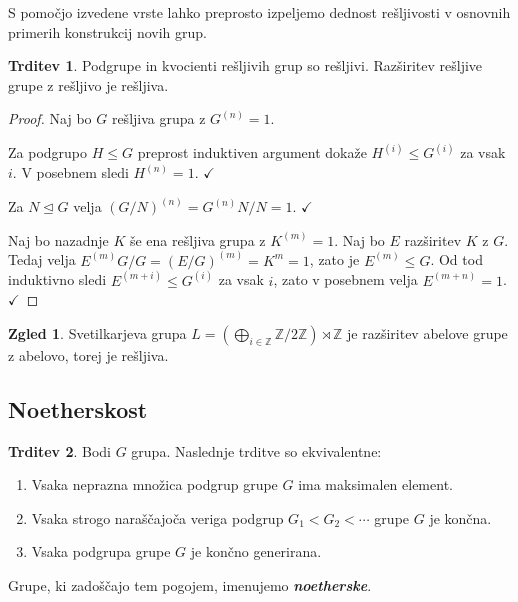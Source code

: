 \documentclass[11pt]{book}
\def\ZZ{\mathbb{Z}}
\def\definicija{\color{rdeca}\bf\em}
\def\kljuka{$\checkmark$}
\theoremstyle{definition}
\theoremstyle{zgled}
\newtheorem*{zgled}{Zgled}
\theoremstyle{odprtproblem}
\theoremstyle{domacanaloga}
\newenvironment{dokaz}
    {\color{siva}\begin{proof}}
    {\end{proof}}
\theoremstyle{izrek}
\newtheorem*{trditev}{Trditev}
\begin{document}
S pomočjo izvedene vrste lahko preprosto izpeljemo dednost rešljivosti v osnovnih primerih konstrukcij novih grup.

\begin{trditev}
Podgrupe in kvocienti rešljivih grup so rešljivi. Razširitev rešljive grupe z rešljivo je rešljiva.
\end{trditev}

\begin{dokaz}
Naj bo $G$ rešljiva grupa z $G^{(n)} = 1$. 

Za podgrupo $H \leq G$ preprost induktiven argument dokaže $H^{(i)} \leq G^{(i)}$ za vsak $i$. V posebnem sledi $H^{(n)} = 1$. \kljuka

Za $N \unlhd G$ velja $(G/N)^{(n)} = G^{(n)}N/N = 1$. \kljuka

Naj bo nazadnje $K$ še ena rešljiva grupa z $K^{(m)} = 1$. Naj bo $E$ razširitev $K$ z $G$. Tedaj velja $E^{(m)}G/G = (E/G)^{(m)} = K^m = 1$, zato je $E^{(m)} \leq G$. Od tod induktivno sledi $E^{(m+i)} \leq G^{(i)}$ za vsak $i$, zato v posebnem velja $E^{(m+n)} = 1$. \kljuka
\end{dokaz}

\begin{zgled}
Svetilkarjeva grupa $L = (\bigoplus_{i \in \ZZ} \ZZ/2\ZZ) \rtimes \ZZ$ je razširitev abelove grupe z abelovo, torej je rešljiva.
\end{zgled}

\subsection{Noetherskost}

\begin{trditev}
Bodi $G$ grupa. Naslednje trditve so ekvivalentne:
\vspace{-0.5\baselineskip}
\begin{enumerate}[noitemsep]
    \item Vsaka neprazna množica podgrup grupe $G$ ima maksimalen element.
    \item Vsaka strogo naraščajoča veriga podgrup $G_1 < G_2 < \cdots$ grupe $G$ je končna.
    \item Vsaka podgrupa grupe $G$ je končno generirana. \vspace{-\baselineskip}
\end{enumerate}
\end{trditev}

Grupe, ki zadoščajo tem pogojem, imenujemo {\definicija noetherske}.
\end{document}
